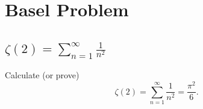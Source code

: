 

%


\newpage
\section{Basel Problem}
\subsection{$\zeta(2)=\sum\limits_{n=1}^{\infty}\frac{1}{n^2}$}
\begin{prb}
    Calculate (or prove) $$\zeta(2)=\sum\limits_{n=1}^{\infty}\frac{1}{n^2}=\frac{\pi^2}{6}.$$
\end{prb}

